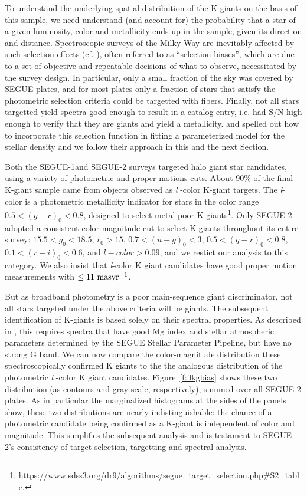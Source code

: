 \documentclass[12pt,preprint]{aastex}
\begin{document}
To understand the underlying spatial distribution of the K giants on the basis of this sample, we need understand (and account for) the probability that a star of a given luminosity, color and metallicity ends up in the sample, given its direction and distance.  
Spectroscopic surveys of the Milky Way are inevitably  affected by such selection effects (cf. \citet{Rix2013}),
 often referred to as ``selection biases'', which are due to a set of objective and repeatable decisions of what to observe,
  necessitated by the survey design. In particular, only a small fraction of the sky was covered by SEGUE plates, 
  and for most plates only a fraction of stars that satisfy the photometric selection criteria could be targetted with fibers. Finally, not all stars targetted yield spectra good enough to result in a catalog entry, i.e. had S/N high enough to
  verify that they are giants and yield a  metallicity. \citet{Bovy2012} and \citet{Rix2013} spelled out how to incorporate this selection function in fitting a parameterized model for the stellar density and we follow their approach in this and the next Section.
  
Both the SEGUE-1and SEGUE-2 surveys targeted halo giant star candidates, using a variety of photometric and proper motions cuts.  About 90\% of the final K-giant sample came from objects observed as \textit{l} -color K-giant targets. 
The \textit{l}-color is a photometric metallicity indicator for stars in the color range $0.5 < (g-r)_0 < 0.8$, designed to select metal-poor K giants\footnote{https://www.sdss3.org/dr9/algorithms/segue\_target\_selection.php\#S2\_table.}.
Only SEGUE-2 adopted a consistent color-magnitude cut to select K giants throughout its entire survey: $15.5<g_0<18.5$, $r_0>15$, $0.7<(u-g)_0<3$, $0.5<(g-r)_0<0.8$, $0.1<(r-i)_0<0.6$, and $l-color>0.09$, and we restict our analysis to this category. We also insist that \textit{l}-color K giant candidates have good proper motion measurements with $\le \rm 11~masyr^{-1}$.

But as broadband photometry is a poor main-sequence giant discriminator, not all stars targeted under the above criteria will be giants.  The subsequent identification of K-giants is based solely on their spectral properties.  As described in \citet{Xue2014}, this requires spectra that have good Mg index and stellar atmospheric parameters determined by the SEGUE Stellar Parameter Pipeline\citep[SSPP;][]{Lee2008a,Lee2008b,Lee2011}, but have no strong G band.
We can now compare the color-magnitude distribution these spectroscopically confirmed K giants 
to the the analogous distribution of the photometric \textit{l} -color K giant candidates.
Figure~\ref{f:flkgbias} shows these two distribution (as contours and gray-scale, respectively), summed over all SEGUE-2 plates. As in particular the marginalized histograms at the sides of the panels show, these two distributions are nearly indistinguishable: the chance of a photometric candidate being confirmed as a K-giant is independent of color and magnitude. This simplifies the subsequent analysis and is testament to SEGUE-2's consistency of target selection, targetting and spectral analysis. 
\end{document}
